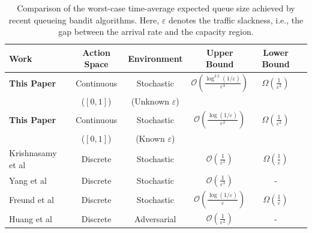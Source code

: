 \documentclass[12pt,draftcls, onecolumn]{IEEEtran}
\begin{document}
\begin{table}[t]
\centering
\caption{Comparison of the worst-case time-average expected queue size achieved by recent queueing bandit algorithms. Here, $\varepsilon$ denotes the traffic slackness, i.e., the gap between the arrival rate and the capacity region.}
\label{tab:comparison}
\small
\begin{tabular}{lccccc}
\toprule
\textbf{Work} & \textbf{Action Space} & \textbf{Environment} & \textbf{Upper Bound}&\textbf{Lower Bound}\\
\midrule
\textbf{This Paper} & Continuous   & Stochastic & $\mathcal{O}\left(\frac{\log^{3.5}(1/\varepsilon)}{\varepsilon^3}\right)$&$\Omega\left(\frac{1}{\varepsilon^2}\right)$ \\[3pt]
&  ($[0,1]$)& (Unknown $\varepsilon$)& &\\[3pt]
\hline
\textbf{This Paper} & Continuous    & Stochastic & $\mathcal{O}\left(\frac{\log(1/\varepsilon)}{\varepsilon^2}\right)$ &$\Omega\left(\frac{1}{\varepsilon^2}\right)$\\[3pt]
& ($[0,1]$)& (Known $\varepsilon$)& &\\[3pt]
\hline
Krishnasamy et al~\cite{Krishnasamy2020}& Discrete  &Stochastic& $\mathcal{O}\!\left(\frac{1}{\varepsilon^2}\right)$ &$\Omega\left(\frac{1}{\varepsilon}\right)$\\[3pt]
\hline
Yang et al~\cite{Yang2023}& Discrete & Stochastic & $\mathcal{O}\!\left(\frac{1}{\varepsilon^3}\right)$ &- \\[3pt]
\hline
Freund et al~\cite{Freund2023} & Discrete  & Stochastic &$\mathcal{O}\left(\frac{\log(1/\varepsilon)}{\varepsilon}\right)$ &$\Omega\left(\frac{1}{\varepsilon}\right)$\\[3pt]
\hline
Huang et al~\cite{Huang2024} & Discrete  & Adversarial & $\mathcal{O}\!\left(\frac{1}{\varepsilon^2}\right)$  &- \\
\bottomrule
\end{tabular}
\end{table}
\end{document}
